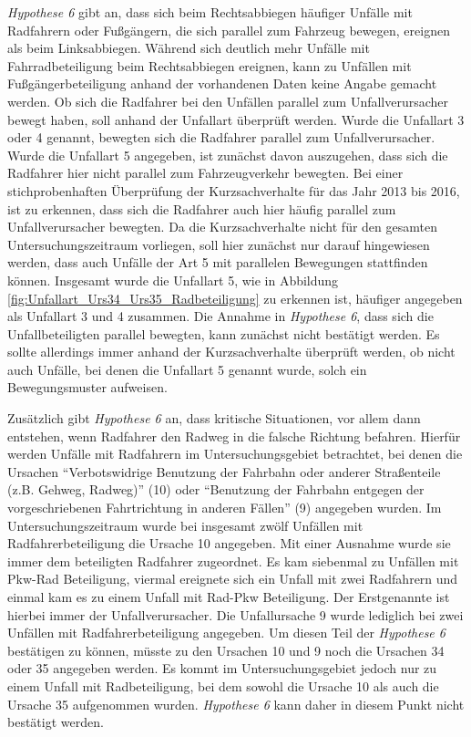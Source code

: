 \textit{Hypothese 6} gibt an, dass sich beim Rechtsabbiegen häufiger Unfälle mit Radfahrern oder Fußgängern, die sich parallel zum Fahrzeug bewegen, ereignen als beim Linksabbiegen. Während sich deutlich mehr Unfälle mit Fahrradbeteiligung beim Rechtsabbiegen ereignen, kann zu Unfällen mit Fußgängerbeteiligung anhand der vorhandenen Daten keine Angabe gemacht werden. Ob sich die Radfahrer bei den Unfällen parallel zum Unfallverursacher bewegt haben, soll anhand der Unfallart überprüft werden. Wurde die Unfallart 3 oder 4 genannt, bewegten sich die Radfahrer parallel zum Unfallverursacher. Wurde die Unfallart 5 angegeben, ist zunächst davon auszugehen, dass sich die Radfahrer hier nicht parallel zum Fahrzeugverkehr bewegten. Bei einer stichprobenhaften Überprüfung der Kurzsachverhalte für das Jahr 2013 bis 2016, ist zu erkennen, dass sich die Radfahrer auch hier häufig parallel zum Unfallverursacher bewegten. Da die Kurzsachverhalte nicht für den gesamten Untersuchungszeitraum vorliegen, soll hier zunächst nur darauf hingewiesen werden, dass auch Unfälle der Art 5 mit parallelen Bewegungen stattfinden können. Insgesamt wurde die Unfallart 5, wie in Abbildung \ref{fig:Unfallart_Urs34_Urs35_Radbeteiligung} zu erkennen ist, häufiger angegeben als Unfallart 3 und 4 zusammen. Die Annahme in \textit{Hypothese 6}, dass sich die Unfallbeteiligten parallel bewegten, kann zunächst nicht bestätigt werden. Es sollte allerdings immer anhand der Kurzsachverhalte überprüft werden, ob nicht auch Unfälle, bei denen die Unfallart 5 genannt wurde, solch ein Bewegungsmuster aufweisen.

Zusätzlich gibt \textit{Hypothese 6} an, dass kritische Situationen, vor allem dann entstehen, wenn Radfahrer den Radweg in die falsche Richtung befahren. Hierfür werden Unfälle mit Radfahrern im Untersuchungsgebiet betrachtet, bei denen die Ursachen \enquote{Verbotswidrige Benutzung der Fahrbahn oder anderer Straßenteile (z.B. Gehweg, Radweg)} (10) oder \enquote{Benutzung der Fahrbahn entgegen der vorgeschriebenen Fahrtrichtung in anderen Fällen} (9) angegeben wurden. Im Untersuchungszeitraum wurde bei insgesamt zwölf Unfällen mit Radfahrerbeteiligung die Ursache 10 angegeben. Mit einer Ausnahme wurde sie immer dem beteiligten Radfahrer zugeordnet. Es kam siebenmal zu Unfällen mit Pkw-Rad Beteiligung, viermal ereignete sich ein Unfall mit zwei Radfahrern und einmal kam es zu einem Unfall mit Rad-Pkw Beteiligung. Der Erstgenannte ist hierbei immer der Unfallverursacher. Die Unfallursache 9 wurde lediglich bei zwei Unfällen mit Radfahrerbeteiligung angegeben. Um diesen Teil der \textit{Hypothese 6} bestätigen zu können, müsste zu den Ursachen 10 und 9 noch die Ursachen 34 oder 35 angegeben werden. Es kommt im Untersuchungsgebiet jedoch nur zu einem Unfall mit Radbeteiligung, bei dem sowohl die Ursache 10 als auch die Ursache 35 aufgenommen wurden. \textit{Hypothese 6} kann daher in diesem Punkt nicht bestätigt werden.

